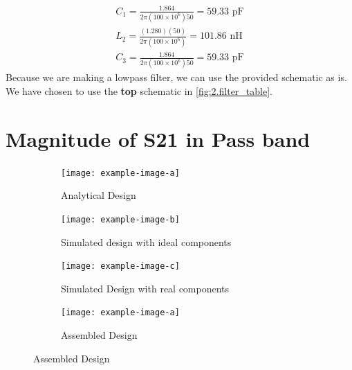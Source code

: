 \documentclass[letterpaper,12pt]{article}
\begin{document}
\begin{align*}
    C_1 = \frac{1.864}{2\pi(100\times10^6)50} = 59.33 \text{ pF} \\
    L_2 = \frac{(1.280)(50)}{2\pi(100\times10^6)} = 101.86 \text{ nH} \\
    C_3 = \frac{1.864}{2\pi(100\times10^6)50} = 59.33 \text{ pF}
\end{align*}
Because we are making a lowpass filter, we can use the provided schematic as is. We have chosen to use the \textbf{top} schematic in \ref{fig:2.filter_table}.

\newpage
\section{Magnitude of S21 in Pass band}
\begin{figure}[H]
    \begin{subfigure}[t]{.49\textwidth}
      \centering
      \texttt{[image: example-image-a]}
      \caption{Analytical Design}
    \end{subfigure}
    \hfill
    \begin{subfigure}[t]{.49\textwidth}
      \centering
      \texttt{[image: example-image-b]}
      \caption{Simulated design with ideal components}
    \end{subfigure}
  
    \medskip
  
    \begin{subfigure}[t]{.49\textwidth}
      \centering
      \texttt{[image: example-image-c]}
      \caption{Simulated Design with real components}
    \end{subfigure}
    \hfill
    \begin{subfigure}[t]{.49\textwidth}
      \centering
      \texttt{[image: example-image-a]}
      \caption{Assembled Design}
    \end{subfigure}
  \end{figure}
\end{document}
